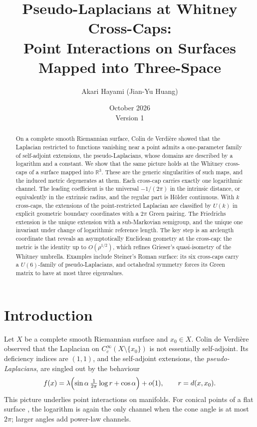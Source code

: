 \documentclass[11pt]{article}
\title{Pseudo-Laplacians at Whitney Cross-Caps:\\
Point Interactions on Surfaces Mapped into Three-Space}
\author{Akari Hayami (Jian-Yu Huang)}
\date{October 2026\\\small Version 1}
\theoremstyle{definition}\newtheorem{definition}[theorem]{Definition}
\theoremstyle{remark}\newtheorem{remark}[theorem]{Remark}
\newcommand{\R}{\mathbb R}\newcommand{\C}{\mathbb C}\newcommand{\Z}{\mathbb Z}
\begin{document}
\maketitle
\begin{abstract}
On a complete smooth Riemannian surface, Colin de Verdière showed that the Laplacian
restricted to functions vanishing near a point admits a one-parameter family of
self-adjoint extensions, the pseudo-Laplacians, whose domains are described
by a logarithm and a constant. We show that the same picture holds at the
Whitney cross-caps of a surface mapped into $\R^3$. These are the generic
singularities of such maps, and the induced metric degenerates at them.
Each cross-cap carries exactly one logarithmic channel. The leading coefficient
is the universal $-1/(2\pi)$ in the intrinsic distance, or equivalently in the
extrinsic radius, and the regular part is H\"older continuous. With $k$
cross-caps, the extensions of the point-restricted Laplacian are classified by
$U(k)$ in explicit geometric boundary coordinates with a $2\pi$ Green pairing.
The Friedrichs extension is the unique extension with a sub-Markovian
semigroup, and the unique one invariant under change of logarithmic reference
length. The key step is an arclength coordinate that reveals an asymptotically
Euclidean geometry at the cross-cap: the metric is the identity up to
$O(\rho^{1/2})$, which refines Grieser's quasi-isometry of the Whitney umbrella.
Examples include Steiner's Roman surface: its six cross-caps carry a
$U(6)$-family of pseudo-Laplacians, and octahedral symmetry forces its Green
matrix to have at most three eigenvalues.
\end{abstract}
\tableofcontents

\section{Introduction}\label{sec:intro}
Let $X$ be a complete smooth Riemannian surface and $x_0\in X$. Colin de
Verdière \cite{cdv} observed that the Laplacian on $C_c^\infty(X\setminus\{x_0\})$
is not essentially self-adjoint. Its deficiency indices are $(1,1)$, and the
self-adjoint extensions, the \emph{pseudo-Laplacians}, are singled out by the
behaviour
\[
 f(x)=\lambda\Bigl(\sin\alpha\,\tfrac{1}{2\pi}\log r+\cos\alpha\Bigr)+o(1),
 \qquad r=d(x,x_0).
\]
This picture underlies point interactions on manifolds. For conical points
of a flat surface \cite{hk}, the logarithm is again the only channel when the
cone angle is at most $2\pi$; larger angles add power-law channels.
\end{document}
